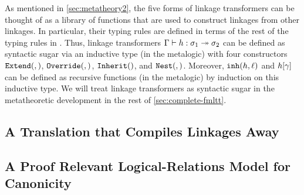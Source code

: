 

%

As mentioned in \cref{sec:metatheory2}, the five forms of linkage transformers can be
thought of as a library of functions that are used to construct linkages from other
linkages.
In particular, their typing rules are defined in terms of the rest of the typing
rules in \TT.
Thus, linkage transformers $ {\Gamma} \vdash {h} : {\sigma_1} \twoheadrightarrow {\ensuremath{\sigma}_2}$ can be defined
as syntactic sugar via an inductive type (in the meta\-logic) with four constructors
$\texttt{Extend}({},{})$, $\texttt{Override}({},{})$, $\texttt{Inherit}({})$, and $\texttt{Nest}({},{})$.
Moreover, $\texttt{inh}({h},{\ell})$ and ${h}\!\left[{\gamma}\right]$ can be defined
as recursive functions (in the meta\-logic) by induction on this inductive type.
We will treat linkage transformers as syntactic sugar in the meta\-theoretic development
in the rest of \cref{sec:complete-fmltt}.

\subsection{A Translation that Compiles Linkages Away}





% 


\subsection{A Proof Relevant Logical-Relations Model for Canonicity}
\label{sec:canonicity-model}


